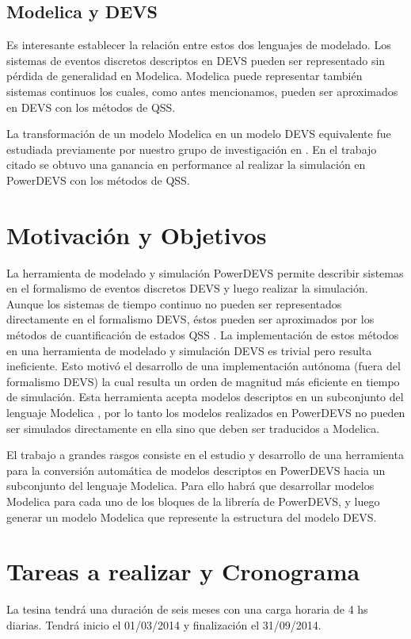 \documentclass[a4paper,	11pt]{article}
\begin{document}
\subsection*{Modelica y DEVS}
Es interesante establecer la relación entre estos dos lenguajes de modelado. 
Los sistemas de eventos discretos descriptos en DEVS pueden ser representado sin pérdida de generalidad en Modelica.
Modelica puede representar también sistemas continuos los cuales, como antes mencionamos, pueden ser aproximados en DEVS con los métodos de QSS.

La transformación de un modelo Modelica en un modelo DEVS equivalente fue estudiada previamente por nuestro grupo de investigación en \cite{Flo11}. 
En el trabajo citado se obtuvo una ganancia en performance  al realizar la simulación en PowerDEVS con los métodos de QSS.


\section{Motivación y Objetivos}
La herramienta de modelado y simulación  PowerDEVS \cite{BK11} permite describir sistemas en el formalismo de eventos discretos DEVS y luego realizar
la simulación. Aunque los sistemas de tiempo continuo no pueden ser representados directamente en el formalismo DEVS, éstos pueden 
ser aproximados por los métodos de cuantificación de estados QSS \cite{Cel06}. La implementación de estos métodos en una herramienta de modelado y simulación
DEVS es trivial pero resulta ineficiente. Esto motivó el desarrollo de una implementación autónoma \cite{Fer12} (fuera del formalismo DEVS) la cual resulta un orden
de magnitud más eficiente en tiempo de simulación. Esta herramienta acepta modelos descriptos en un subconjunto del lenguaje Modelica \cite{Fri98}, por lo tanto
los modelos realizados en PowerDEVS no pueden ser simulados directamente en ella sino que deben ser traducidos a Modelica.

El trabajo a grandes rasgos consiste en el estudio y desarrollo de una herramienta para la conversión automática de modelos
descriptos en PowerDEVS hacia un subconjunto del lenguaje Modelica. 
Para ello habrá que desarrollar modelos Modelica para cada uno de los bloques de la librería de PowerDEVS, y luego generar un modelo Modelica
que represente la estructura del modelo DEVS.


\section{Tareas a realizar y Cronograma}
La tesina tendrá una duración de seis meses con una carga
horaria de 4 hs diarias. Tendrá inicio el 01/03/2014 y finalización el
31/09/2014.
\end{document}
